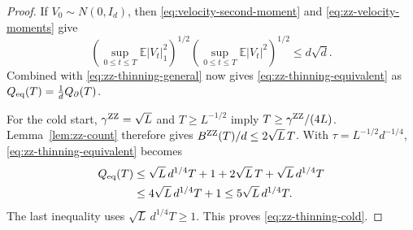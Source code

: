 \documentclass{amsart}
\theoremstyle{plain}
\theoremstyle{definition}
\theoremstyle{remark}
\newcommand{\EE}{\mathbb{E}}
\newcommand{\abs}[1]{\lvert#1\rvert}
\newcommand{\E}{\EE}
\newcommand{\1}{\mathbf 1}
\newcommand{\zz}{{\rm ZZ}}
\begin{document}
\begin{proof}
If $V_0\sim N(0,I_d)$, then
\eqref{eq:velocity-second-moment} and \eqref{eq:zz-velocity-moments} give
\[
\left(\sup_{0\le t\le T}\E\abs{V_t}_1^2\right)^{1/2}
\left(\sup_{0\le t\le T}\E\abs{V_t}^2\right)^{1/2}
\le d\sqrt d.
\]
Combined with \eqref{eq:zz-thinning-general} now gives
\eqref{eq:zz-thinning-equivalent} as $Q_{\rm eq}(T) = \frac{1}{d} Q_\partial(T)$.

For the cold start, $\gamma^{\zz}=\sqrt L$ and $T\ge L^{-1/2}$ imply
$T\ge\gamma^{\zz}/(4L)$.  Lemma~\ref{lem:zz-count} therefore gives
$B^{\zz}(T)/d\le2\sqrt L\,T$.  With
$\tau=L^{-1/2}d^{-1/4}$, \eqref{eq:zz-thinning-equivalent} becomes
\[
\begin{aligned}
        Q_{\rm eq}(T)
        &\le\sqrt L\,d^{1/4}T+1
             +2\sqrt L\,T
             +\sqrt L\,d^{1/4}T\\
        &\le4\sqrt L\,d^{1/4}T+1
        \le5\sqrt L\,d^{1/4}T.
\end{aligned}
\]
The last inequality uses
$\sqrt L\,d^{1/4}T\ge1$.
This proves 
\eqref{eq:zz-thinning-cold}.
\end{proof}
\end{document}

